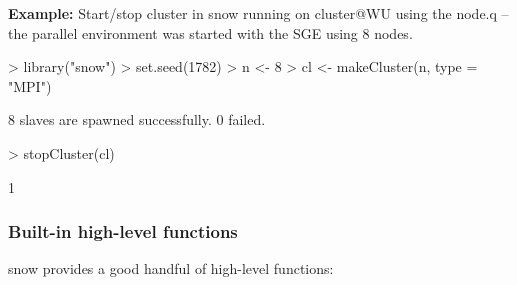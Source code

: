 \textbf{Example:} Start/stop cluster in snow \newline
running on cluster@WU using the node.q -- the parallel environment was
started with the SGE using 8 nodes.

\begin{Schunk}
\begin{Sinput}
> library("snow")
> set.seed(1782)
> n <- 8
> cl <- makeCluster(n, type = "MPI")
\end{Sinput}
\begin{Soutput}
	8 slaves are spawned successfully. 0 failed.
\end{Soutput}
\begin{Sinput}
> stopCluster(cl)
\end{Sinput}
\begin{Soutput}
[1] 1
\end{Soutput}
\end{Schunk}


\subsubsection{Built-in high-level functions}

snow provides a good handful of high-level functions: 


